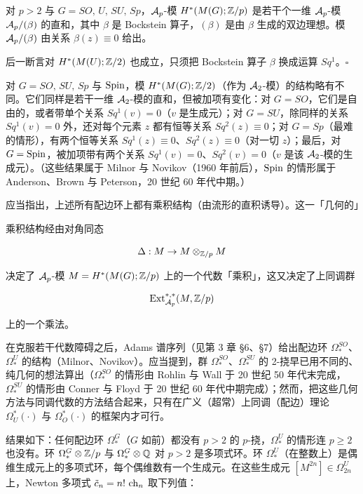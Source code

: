 对 $p>2$ 与 $G=SO,\,U,\,SU,\,Sp$，$\mathcal{A}_p$-模 $H^*(M(G);\mathbb{Z}/p)$ 是若干个一维 $\mathcal{A}_p$-模 $\mathcal{A}_p/(\beta)$ 的直和，其中 $\beta$ 是 Bockstein 算子，$(\beta)$ 是由 $\beta$ 生成的双边理想。模 $\mathcal{A}_p/(\beta)$ 由关系 $\beta(z)\equiv 0$ 给出。

\begin{remark}{}
后一断言对 $H^*(M(U);\mathbb{Z}/2)$ 也成立，只须把 Bockstein 算子 $\beta$ 换成运算 $Sq^1$。\hfill$\square$
\end{remark}

对 $G=SO,\,SU,\,Sp$ 与 $\mathrm{Spin}$，模 $H^*(M(G);\mathbb{Z}/2)$（作为 $\mathcal{A}_2$-模）的结构略有不同。它们同样是若干一维 $\mathcal{A}_2$-模的直和，但被加项有变化：对 $G=SO$，它们是自由的，或者带单个关系 $Sq^1(v)=0$（$v$ 是生成元）；对 $G=SU$，除同样的关系 $Sq^1(v)=0$ 外，还对每个元素 $z$ 都有恒等关系 $Sq^2(z)\equiv 0$；对 $G=Sp$（最难的情形），有两个恒等关系 $Sq^1(z)\equiv 0$、$Sq^2(z)\equiv 0$（对一切 $z$）；最后，对 $G=\mathrm{Spin}$，被加项带有两个关系 $Sq^1(v)=0$、$Sq^2(v)=0$（$v$ 是该 $\mathcal{A}_2$-模的生成元）。（这些结果属于 Milnor 与 Novikov（1960 年前后），$\mathrm{Spin}$ 的情形属于 Anderson、Brown 与 Peterson，20 世纪 60 年代中期。）

应当指出，上述所有配边环上都有乘积结构（由流形的直积诱导）。这一「几何的」

乘积结构经由对角同态

\[ \Delta:M\to M\otimes_{\mathbb{Z}/p}M \]

决定了 $\mathcal{A}_p$-模 $M=H^*(M(G);\mathbb{Z}/p)$ 上的一个代数「乘积」，这又决定了上同调群

\[ \operatorname{Ext}_{\mathcal{A}_p}^{*,*}(M,\mathbb{Z}/p) \]

上的一个乘法。

在克服若干代数障碍之后，Adams 谱序列（见第 3 章 §6、§7）给出配边环 $\Omega_*^{SO}$、$\Omega_*^{U}$ 的结构（Milnor、Novikov）。应当提到，群 $\Omega_*^{SO}$、$\Omega_*^{SU}$ 的 2-挠早已用不同的、纯几何的想法算出（$\Omega_*^{SO}$ 的情形由 Rohlin 与 Wall 于 20 世纪 50 年代末完成，$\Omega_*^{SU}$ 的情形由 Conner 与 Floyd 于 20 世纪 60 年代中期完成）；然而，把这些几何方法与同调代数的方法结合起来，只有在广义（超常）上同调（配边）理论 $\Omega_U^*(\cdot)$ 与 $\Omega_O^*(\cdot)$ 的框架内才可行。


结果如下：任何配边环 $\Omega_*^{G}$（$G$ 如前）都没有 $p>2$ 的 $p$-挠，$\Omega_*^{U}$ 的情形连 $p\ge 2$ 也没有。环 $\Omega_*^{G}\otimes\mathbb{Z}/p$ 与 $\Omega_*^{G}\otimes\mathbb{Q}$ 对 $p>2$ 是多项式环。环 $\Omega_*^{U}$（在整数上）是偶维生成元上的多项式环，每个偶维数有一个生成元。在这些生成元 $[M^{2n}]\in\Omega_{2n}^{U}$ 上，Newton 多项式 $\tilde c_n=n!\,\operatorname{ch}_n$ 取下列值：

